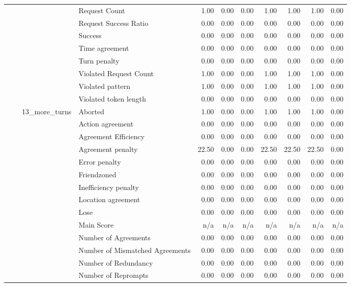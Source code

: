 \begin{tabular}{llllrrrrrrr}
 &  &  & Request Count & 1.00 & 0.00 & 0.00 & 1.00 & 1.00 & 1.00 & 0.00 \\
 &  &  & Request Success Ratio & 0.00 & 0.00 & 0.00 & 0.00 & 0.00 & 0.00 & 0.00 \\
 &  &  & Success & 0.00 & 0.00 & 0.00 & 0.00 & 0.00 & 0.00 & 0.00 \\
 &  &  & Time agreement & 0.00 & 0.00 & 0.00 & 0.00 & 0.00 & 0.00 & 0.00 \\
 &  &  & Turn penalty & 0.00 & 0.00 & 0.00 & 0.00 & 0.00 & 0.00 & 0.00 \\
 &  &  & Violated Request Count & 1.00 & 0.00 & 0.00 & 1.00 & 1.00 & 1.00 & 0.00 \\
 &  &  & Violated pattern & 1.00 & 0.00 & 0.00 & 1.00 & 1.00 & 1.00 & 0.00 \\
 &  &  & Violated token length & 0.00 & 0.00 & 0.00 & 0.00 & 0.00 & 0.00 & 0.00 \\
\cline{3-11}
 &  & \multirow[t]{27}{*}{13_more_turns} & Aborted & 1.00 & 0.00 & 0.00 & 1.00 & 1.00 & 1.00 & 0.00 \\
 &  &  & Action agreement & 0.00 & 0.00 & 0.00 & 0.00 & 0.00 & 0.00 & 0.00 \\
 &  &  & Agreement Efficiency & 0.00 & 0.00 & 0.00 & 0.00 & 0.00 & 0.00 & 0.00 \\
 &  &  & Agreement penalty & 22.50 & 0.00 & 0.00 & 22.50 & 22.50 & 22.50 & 0.00 \\
 &  &  & Error penalty & 0.00 & 0.00 & 0.00 & 0.00 & 0.00 & 0.00 & 0.00 \\
 &  &  & Friendzoned & 0.00 & 0.00 & 0.00 & 0.00 & 0.00 & 0.00 & 0.00 \\
 &  &  & Inefficiency penalty & 0.00 & 0.00 & 0.00 & 0.00 & 0.00 & 0.00 & 0.00 \\
 &  &  & Location agreement & 0.00 & 0.00 & 0.00 & 0.00 & 0.00 & 0.00 & 0.00 \\
 &  &  & Lose & 0.00 & 0.00 & 0.00 & 0.00 & 0.00 & 0.00 & 0.00 \\
 &  &  & Main Score & n/a & n/a & n/a & n/a & n/a & n/a & n/a \\
 &  &  & Number of Agreements & 0.00 & 0.00 & 0.00 & 0.00 & 0.00 & 0.00 & 0.00 \\
 &  &  & Number of Mismatched Agreements & 0.00 & 0.00 & 0.00 & 0.00 & 0.00 & 0.00 & 0.00 \\
 &  &  & Number of Redundancy & 0.00 & 0.00 & 0.00 & 0.00 & 0.00 & 0.00 & 0.00 \\
 &  &  & Number of Reprompts & 0.00 & 0.00 & 0.00 & 0.00 & 0.00 & 0.00 & 0.00 \\

\end{tabular}
